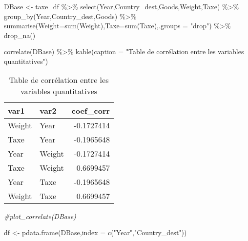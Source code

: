 \documentclass[
]{book}
\newenvironment{Shaded}{\begin{snugshade}}{\end{snugshade}}
\newcommand{\AttributeTok}[1]{\textcolor[rgb]{0.77,0.63,0.00}{#1}}
\newcommand{\CommentTok}[1]{\textcolor[rgb]{0.56,0.35,0.01}{\textit{#1}}}
\newcommand{\FunctionTok}[1]{\textcolor[rgb]{0.00,0.00,0.00}{#1}}
\newcommand{\NormalTok}[1]{#1}
\newcommand{\OtherTok}[1]{\textcolor[rgb]{0.56,0.35,0.01}{#1}}
\newcommand{\SpecialCharTok}[1]{\textcolor[rgb]{0.00,0.00,0.00}{#1}}
\newcommand{\StringTok}[1]{\textcolor[rgb]{0.31,0.60,0.02}{#1}}
\begin{document}
\begin{Shaded}
\begin{Highlighting}[]
\NormalTok{DBase }\OtherTok{\textless{}{-}}\NormalTok{ taxe\_df  }\SpecialCharTok{\%\textgreater{}\%} 
  \FunctionTok{select}\NormalTok{(Year,Country\_dest,Goods,Weight,Taxe) }\SpecialCharTok{\%\textgreater{}\%} 
  \FunctionTok{group\_by}\NormalTok{(Year,Country\_dest,Goods) }\SpecialCharTok{\%\textgreater{}\%} 
  \FunctionTok{summarise}\NormalTok{(}\AttributeTok{Weight=}\FunctionTok{sum}\NormalTok{(Weight),}\AttributeTok{Taxe=}\FunctionTok{sum}\NormalTok{(Taxe),}\AttributeTok{.groups =} \StringTok{"drop"}\NormalTok{) }\SpecialCharTok{\%\textgreater{}\%} \FunctionTok{drop\_na}\NormalTok{() }

\FunctionTok{correlate}\NormalTok{(DBase) }\SpecialCharTok{\%\textgreater{}\%} \FunctionTok{kable}\NormalTok{(}\AttributeTok{caption =} \StringTok{"Table de corrélation entre les variables quantitatives"}\NormalTok{)}
\end{Highlighting}
\end{Shaded}

\begin{table}

\caption{\label{tab:unnamed-chunk-41}Table de corrélation entre les variables quantitatives}
\centering
\begin{tabular}[t]{l|l|r}
\hline
var1 & var2 & coef\_corr\\
\hline
Weight & Year & -0.1727414\\
\hline
Taxe & Year & -0.1965648\\
\hline
Year & Weight & -0.1727414\\
\hline
Taxe & Weight & 0.6699457\\
\hline
Year & Taxe & -0.1965648\\
\hline
Weight & Taxe & 0.6699457\\
\hline
\end{tabular}
\end{table}

\begin{Shaded}
\begin{Highlighting}[]
\CommentTok{\#plot\_correlate(DBase)}
\end{Highlighting}
\end{Shaded}

\begin{Shaded}
\begin{Highlighting}[]
\NormalTok{df }\OtherTok{\textless{}{-}} \FunctionTok{pdata.frame}\NormalTok{(DBase,}\AttributeTok{index =} \FunctionTok{c}\NormalTok{(}\StringTok{"Year"}\NormalTok{,}\StringTok{"Country\_dest"}\NormalTok{))}
\end{Highlighting}
\end{Shaded}
\end{document}
